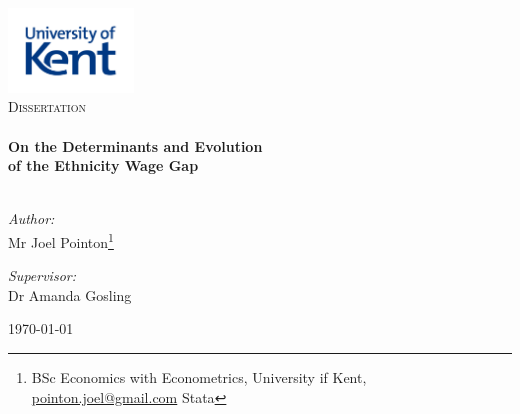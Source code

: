 \begin{titlepage}
\vbox{ }

\vbox{ }

\begin{center}
\includegraphics[width=0.25\textwidth]{./images/kent_logo.jpg}\\[1cm]
\textsc{\LARGE Dissertation}\\[1.5cm]

\vbox{ }
\HRule \\[0.4cm]
{ \huge \bfseries \linespread{1} On the Determinants and Evolution}\\[0.4cm]
{ \huge \bfseries \linespread{1} of the Ethnicity Wage Gap \vspace{-10pt}}\\[0.4cm]
\HRule \\[1.5cm]
\begin{minipage}{0.4\textwidth}
\begin{flushleft} \large
\emph{Author:}\\
Mr Joel Pointon\footnote{BSc Economics with Econometrics, University if Kent, \href{mailto:pointon.joel@gmail.com}{pointon.joel@gmail.com} \newline Stata}
\end{flushleft}
\end{minipage}
\begin{minipage}{0.4\textwidth}
\begin{flushright} \large
\emph{Supervisor:} \\
Dr Amanda Gosling
\end{flushright}
\end{minipage}
\vfill
{\large \today}

\end{center}
\end{titlepage}